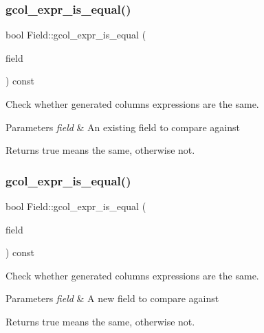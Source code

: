 \subsubsection{\texorpdfstring{gcol\+\_\+expr\+\_\+is\+\_\+equal()}{gcol\_expr\_is\_equal()}\hspace{0.1cm}{\footnotesize\ttfamily [1/2]}}
{\footnotesize\ttfamily bool Field\+::gcol\+\_\+expr\+\_\+is\+\_\+equal (\begin{DoxyParamCaption}\item[{const \mbox{\hyperlink{classField}{Field}} $\ast$}]{field }\end{DoxyParamCaption}) const}

Check whether generated columns\textquotesingle{} expressions are the same.


\begin{DoxyParams}{Parameters}
{\em field} & An existing field to compare against\\
\hline
\end{DoxyParams}
\begin{DoxyReturn}{Returns}
true means the same, otherwise not. 
\end{DoxyReturn}
\mbox{\label{classField_a4dab42898fdc04b1e2c87bc59cf9c049}} 
\subsubsection{\texorpdfstring{gcol\+\_\+expr\+\_\+is\+\_\+equal()}{gcol\_expr\_is\_equal()}\hspace{0.1cm}{\footnotesize\ttfamily [2/2]}}
{\footnotesize\ttfamily bool Field\+::gcol\+\_\+expr\+\_\+is\+\_\+equal (\begin{DoxyParamCaption}\item[{const \mbox{\hyperlink{classCreate__field}{Create\+\_\+field}} $\ast$}]{field }\end{DoxyParamCaption}) const}

Check whether generated columns\textquotesingle{} expressions are the same.


\begin{DoxyParams}{Parameters}
{\em field} & A new field to compare against\\
\hline
\end{DoxyParams}
\begin{DoxyReturn}{Returns}
true means the same, otherwise not. 
\end{DoxyReturn}
\mbox{\label{classField_a22f18fbe3224a5ac4f23a90523b09087}} 
